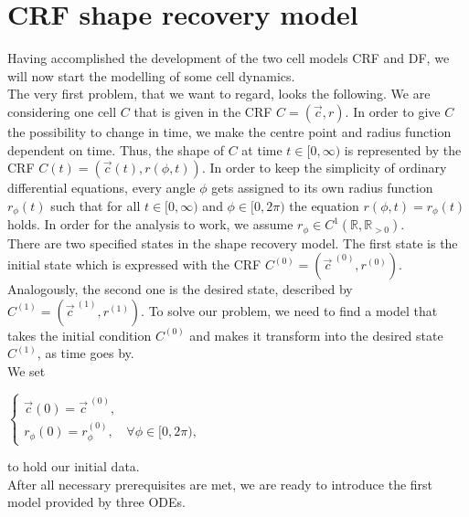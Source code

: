 \documentclass[a4paper,12pt,leqno]{article}
\theoremstyle{plain}
\theoremstyle{remark}
\newcommand{\R}{\mathbb{R}}
\begin{document}
\section{CRF shape recovery model} \label{sec:ShapeRecoveryModel}
Having accomplished the development of the two cell models CRF and DF, we will now start the modelling of some cell dynamics. \\
The very first problem, that we want to regard, looks the following. We are considering one cell $C$ that is given in the CRF $C = (\vec{c}, r)$. In order to give $C$ the possibility to change in time, we make the centre point and radius function dependent on time. Thus, the shape of $C$ at time $t \in [0, \infty)$ is represented by the CRF $C(t) =(\vec{c}(t), r(\phi, t))$. In order to keep the simplicity of ordinary differential equations, every angle $\phi$ gets assigned to its own radius function $r_\phi(t)$ such that for all $t \in [0, \infty)$ and $\phi \in [0, 2\pi)$ the equation $r(\phi, t) = r_\phi(t)$ holds. In order for the analysis to work, we assume $r_\phi \in C^1(\R, \R_{>0})$.\\
There are two specified states in the shape recovery model. The first state is the initial state which is expressed with the CRF $C^{(0)} = (\vec{c}^{\:(0)}, r^{(0)})$. Analogously, the second one is the desired state, described by $C^{(1)} = (\vec{c}^{\:(1)}, r^{(1)})$. To solve our problem, we need to find a model that takes the initial condition $C^{(0)}$ and makes it transform into the desired state $C^{(1)}$, as time goes by. \\
We set
\begin{center}
	$
	 \begin{cases}
	 	
	 	\vec{c}(0) = \vec{c}^{\:(0)}, \\
	 	r_{\phi}(0) = r_{\phi}^{(0)}, & \forall \phi \in  [0, 2\pi),
	 	
	 \end{cases}
	 $
\end{center}
to hold our initial data. \\
After all necessary prerequisites are met, we are ready to introduce the first model provided by three ODEs. \\
\end{document}
